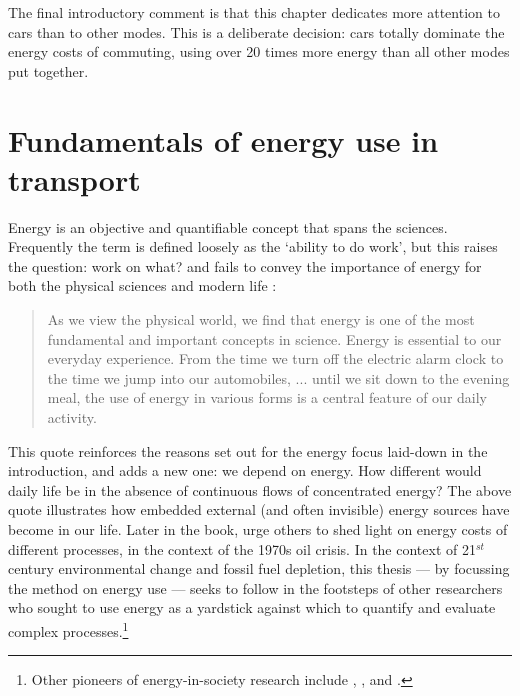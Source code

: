 The final introductory comment is that this chapter dedicates more attention to
cars than to other modes. This is a deliberate decision: cars totally dominate
the energy costs of commuting, using over 20 times more energy than all other modes
put together. 

\section{Fundamentals of energy use in transport} \label{sfundamentals}
Energy is an objective and quantifiable concept that spans the sciences.
Frequently the term is defined loosely as the `ability to do work', but this
raises the question: work on what? and fails to convey the importance of energy
for both the physical sciences and modern life \citep[p.~99]{Rouse1975}:
\begin{quotation}
 As we view the physical world, we find that energy is one of the most
fundamental and important concepts in science. Energy is essential to our
everyday experience. From the time we turn off the electric alarm clock to the
time we jump into our automobiles, ... until we sit down to the evening meal,
the use of energy in various forms is a central feature of our daily activity.
\end{quotation}
This quote reinforces the reasons set out for the energy focus laid-down in the
introduction, and adds a new one: we depend on energy. How different would
daily life be in the absence of continuous flows of concentrated energy?
The above quote illustrates how embedded external (and often invisible)
energy sources have become in our life. Later in the book, \citet{Rouse1975} urge
others to shed light on energy costs of different processes, in the context of
the 1970s oil crisis. In the context of 21$^{st}$ century environmental change
and fossil fuel depletion, this thesis --- by focussing the method on
energy use --- seeks to follow in the footsteps
of other researchers who sought to use energy as a yardstick against which to quantify
and evaluate complex processes.\footnote{Other pioneers of energy-in-society
research include \citet{Soddy1933, Soddy1935}, \citet{Odum1971, Odum2001},
\citet{Steadman1977} and \citet{Smil1993, Smil2005, Smil2008}.
}

